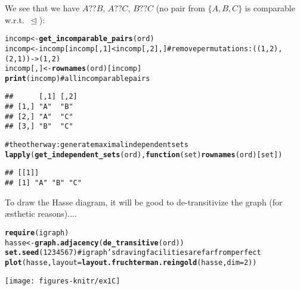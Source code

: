 \documentclass[11pt]{article}\usepackage{graphicx, color}
\makeatletter
\newcommand{\hlfunctioncall}[1]{\textcolor[rgb]{0.501960784313725,0,0.329411764705882}{\textbf{#1}}}%
\newcommand{\hlcomment}[1]{\textcolor[rgb]{0.180392156862745,0.6,0.341176470588235}{#1}}%
\newenvironment{kframe}{%
 \def\at@end@of@kframe{}%
 \ifinner\ifhmode%
  \def\at@end@of@kframe{\end{minipage}}%
  \begin{minipage}{\columnwidth}%
 \fi\fi%
 \def\FrameCommand##1{\hskip\@totalleftmargin \hskip-\fboxsep
 \colorbox{shadecolor}{##1}\hskip-\fboxsep
     \hskip-\linewidth \hskip-\@totalleftmargin \hskip\columnwidth}%
 \MakeFramed {\advance\hsize-\width
   \@totalleftmargin\z@ \linewidth\hsize
   \@setminipage}}%
 {\par\unskip\endMakeFramed%
 \at@end@of@kframe}
\newenvironment{knitrout}{}{} %
\theoremstyle{remark}
\theoremstyle{definition}
\makeatother
\begin{document}
\noindent
We see that we have $A \text{??} B$, $A \text{??} C$,
$B \text{??} C$ (no pair from $\{A,B,C\}$ is comparable
w.r.t.~$\trianglelefteq$):

\begin{knitrout}\small
{}\color{fgcolor}\begin{kframe}
\begin{alltt}
incomp <- \hlfunctioncall{get_incomparable_pairs}(ord)
incomp <- incomp[incomp[,1]<incomp[,2],] \hlcomment{# remove permutations: ((1,2), (2,1))->(1,2)}
incomp[,] <- \hlfunctioncall{rownames}(ord)[incomp]
\hlfunctioncall{print}(incomp) \hlcomment{# all incomparable pairs}
\end{alltt}
\begin{verbatim}
##      [,1] [,2]
## [1,] "A"  "B" 
## [2,] "A"  "C" 
## [3,] "B"  "C"
\end{verbatim}
\begin{alltt}
\hlcomment{# the other way: generate maximal independent sets}
\hlfunctioncall{lapply}(\hlfunctioncall{get_independent_sets}(ord), \hlfunctioncall{function}(set) \hlfunctioncall{rownames}(ord)[set]) 
\end{alltt}
\begin{verbatim}
## [[1]]
## [1] "A" "B" "C"
\end{verbatim}
\end{kframe}
\end{knitrout}


To draw the Hasse diagram, it will be good to de-transitivize
the graph (for \ae{}sthetic reasons)....

\begin{knitrout}\small
{}\color{fgcolor}\begin{kframe}
\begin{alltt}
\hlfunctioncall{require}(igraph)
hasse <- \hlfunctioncall{graph.adjacency}(\hlfunctioncall{de_transitive}(ord))
\hlfunctioncall{set.seed}(1234567) \hlcomment{# igraph's draving facilities are far from perfect}
\hlfunctioncall{plot}(hasse, layout=\hlfunctioncall{layout.fruchterman.reingold}(hasse, dim=2)) 
\end{alltt}
\end{kframe}

{\centering \texttt{[image: figures-knitr/ex1C]} 

}



\end{knitrout}
\end{document}
